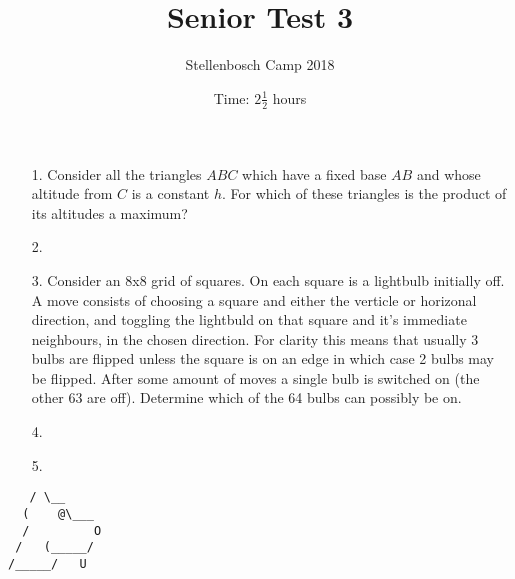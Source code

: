 \documentclass[a4paper, 12pt]{article}
\title{Senior Test 3}
\author{Stellenbosch Camp 2018}
\date{Time: $2 \frac{1}{2}$ hours}
\begin{document}
 \maketitle

\begin{enumerate}

\item[1.] Consider all the triangles $ABC$ which have a fixed base $AB$ and whose altitude from $C$ is a constant $h$. For which of these triangles is the product of its altitudes a maximum? 


% 
\item[2.]  



% 
\item[3.]
Consider an 8x8 grid of squares. On each square is a lightbulb initially off. A move consists of choosing a square and either the verticle or horizonal direction, and toggling the lightbuld on that square and it's immediate neighbours, in the chosen direction. For clarity this means that usually 3 bulbs are flipped unless the square is on an edge in which case 2 bulbs may be flipped. After some amount of moves a single bulb is switched on (the other 63 are off). Determine which of the 64 bulbs can possibly be on. 


% 
\item[4.]


% 
\item[5.]


\end{enumerate}

\vfill

\centering
\begin{BVerbatim}
   / \__
  (    @\___
  /         O
 /   (_____/
/_____/   U
\end{BVerbatim}

\vspace{12mm}
\end{document}
